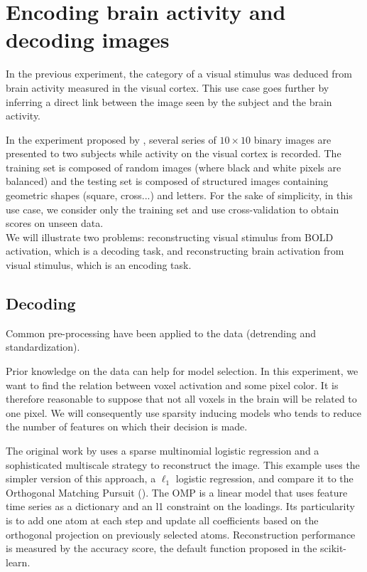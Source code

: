 \documentclass{frontiersSCNS} %
\begin{document}
\section{Encoding brain activity and decoding images}
\label{kamitani}

In the previous experiment, the category of a visual stimulus was deduced from
brain activity measured in the visual cortex.
This use case goes further by inferring a direct link between the image
seen by the subject and the brain activity.

In the experiment proposed by \citep{miyawaki2008}, several series of $10\times10$
binary images are presented to two subjects while activity on the visual cortex
is recorded.
The training set is composed of random images (where black and white pixels
are balanced) and the testing set is composed of structured images containing
geometric shapes (square, cross...) and letters. For the sake of simplicity, in
this use case, we consider only the training set and use cross-validation to
obtain scores on unseen data.\\

We will illustrate two problems: reconstructing visual stimulus from BOLD activation,
which is a decoding task, and reconstructing brain activation from visual
stimulus, which is an encoding task.

\subsection{Decoding}

Common pre-processing have been applied to the data (detrending and
standardization).

Prior knowledge on the data can help for model selection. In this experiment, we
want to find the relation between voxel activation and some pixel color. It is
therefore reasonable to suppose that not all voxels in the brain will be related to one
pixel. We will consequently use sparsity inducing models who tends to
reduce the number of features on which their decision is made.

The original work by \cite{miyawaki2008} uses a sparse multinomial
logistic regression and a sophisticated multiscale strategy to reconstruct the image.
This example uses the simpler version of this approach, a $\ell_1$ logistic
regression, and compare it to the Orthogonal
Matching Pursuit (\cite{mallat1993}). The OMP is a linear model that uses
feature time series as a dictionary and an l1 constraint on the loadings. Its
particularity is to add one atom at each step and update all coefficients
based on the orthogonal projection on previously selected atoms.
Reconstruction performance is measured by the accuracy score, the default
function proposed in the scikit-learn.
\end{document}
